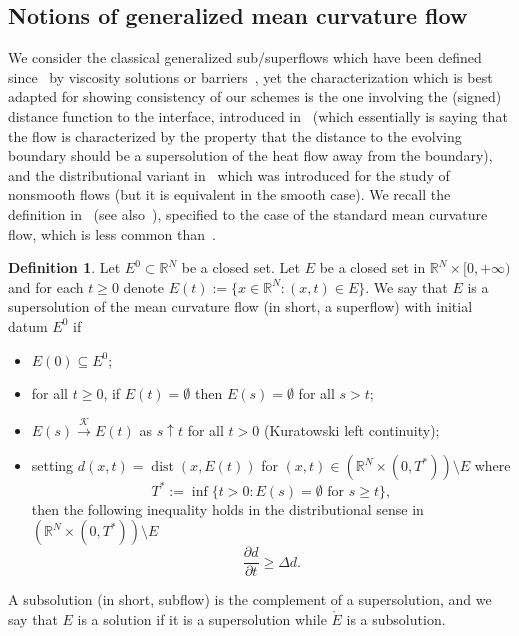 \documentclass[10pt]{amsart}
\theoremstyle{plain}
\theoremstyle{definition}
\newtheorem{definition}[theorem]{Definition}
\newcommand{\R}{\mathbb{R}}
\DeclareMathOperator{\dist}{dist}
\numberwithin{equation}{section}
\begin{document}
\subsection{Notions of generalized mean curvature flow}


We consider the classical generalized sub/superflows which
have been defined since~\cite{EvaSpr} by viscosity solutions
or barriers~\cite{BellettiniNovaga97}, yet the characterization
which is best adapted for showing consistency of our schemes
is the one involving the (signed) distance function to the interface,
introduced in~\cite[Def.~5.1]{Soner93} (which essentially is saying
that the flow is characterized by the property that the distance
to the evolving boundary should be a supersolution of the heat flow
away from the boundary), and the distributional variant
in~\cite[Def.~2.1]{CMP17} which was introduced for the study of nonsmooth
flows (but it is equivalent in the smooth case). We recall the definition
in~\cite[Def.~2.1]{CMP17}
(see also~\cite[Def.~2.2]{CMNP19}), specified to the case of the standard mean curvature flow, which is
less common than~\cite{Soner93}.
\begin{definition}\label{def:distributionalsuperflow}
  Let $E^0\subset \R^N$ be a closed set. Let $E$ be a closed
  set in $\R^N\times [0,+\infty)$ and for each $t\ge 0$ denote
  $E(t):=\{x\in\R^N:(x,t)\in E\}$. We say that $E$ is a supersolution 
  of the mean curvature flow (in short, a superflow) with initial datum $E^0$ if\begin{itemize}
  \item[(a)] $E(0)\subseteq E^0$;
  \item[(b)] for all $t\ge 0$, if $E(t)=\emptyset$ then $E(s)=\emptyset$
    for all $s>t$;
  \item[(c)] $E(s)\stackrel{\mathcal{K}}{\rightarrow}E(t)$ as $s\uparrow t$ for all $t>0$
    (Kuratowski left continuity);
  \item[(d)] setting $d(x,t)=\dist(x,E(t))$ for $(x,t)\in(\R^N\times (0,T^*))\setminus E$ where
    \[ T^*:=\inf \{ t>0: E(s)=\emptyset \text{ for } s\ge t\},\]
    then the following inequality holds in the distributional sense in $(\R^N\times (0,T^*))\setminus E$
    \begin{equation}\label{eq:supsolheat}
      \frac{\partial d}{\partial t} \ge \Delta d.
    \end{equation}
    
  \end{itemize}
  A subsolution (in short, subflow) is the complement of a supersolution, and we say that $E$ is a solution if it is a supersolution while $\mathring{E}$ is a subsolution.
\end{definition}
\end{document}
